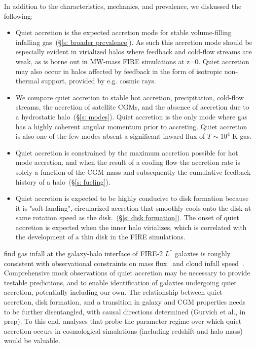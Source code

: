 \documentclass[fleqn,usenatbib]{mnras}
\begin{document}
In addition to the characteristics, mechanics, and prevalence, we diskussed the following:
\begin{itemize}
    \item Quiet accretion is the expected accretion mode for stable volume-filling infalling gas~(\S\ref{s: broader prevalence}).
    As such this accretion mode should be especially evident in virialized halos where feedback and cold-flow streams are weak, as is borne out in MW-mass FIRE simulations at z=0.
    Quiet accretion may also occur in halos affected by feedback in the form of isotropic non-thermal support, provided by e.g. cosmic rays.
    \item We compare quiet accretion to stable hot accretion, precipitation, cold-flow streams, the accretion of satellite CGMs, and the absence of accretion due to a hydrostatic halo~(\S\ref{s: modes}).
    Quiet accretion is the only mode where gas has a highly coherent angular momentum prior to accreting.
    Quiet accretion is also one of the few modes absent a significant inward flux of $T\sim 10^4$ K gas.
    \item Quiet accretion is constrained by the maximum accretion possible for hot mode accretion, and when the result of a cooling flow the accretion rate is solely a function of the CGM mass and subsequently the cumulative feedback history of a halo~(\S\ref{s: fueling}).
    \item Quiet accretion is expected to be highly conducive to disk formation because it is "soft-landing", circularized accretion that smoothly cools onto the disk at same rotation speed as the disk.~(\S\ref{s: disk formation}).
    The onset of quiet accretion is expected when the inner halo virializes, which is correlated with the development of a thin disk in the FIRE simulations.
\end{itemize}

\cite{Trapp2021} find gas infall at the galaxy-halo interface of FIRE-2 $L^*$ galaxies is roughly consistent with observational constraints on mass flux~\citep[e.g.][]{Putman2012, Rohser2016} and cloud infall speed~\citep[e.g.][]{Zheng2017, Werk2019, Bish2019, Ho2020}.
Comprehensive mock observations of quiet accretion may be necessary to provide testable predictions, and to enable identification of galaxies undergoing quiet accretion, potentially including our own.
The relationship between quiet accretion, disk formation, and a transition in galaxy and CGM properties needs to be further disentangled, with causal directions determined (Gurvich et al., in prep).
To this end, analyses that probe the parameter regime over which quiet accretion occurs in cosmological simulations (including redshift and halo mass) would be valuable.
\end{document}
